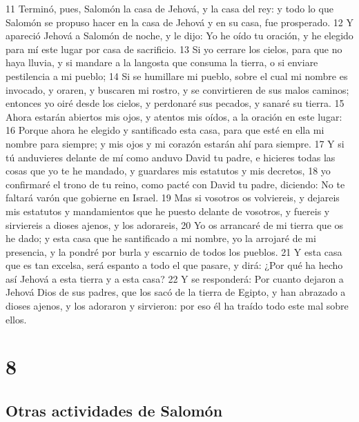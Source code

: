  
11 Terminó, pues, Salomón la casa de Jehová, y la casa del rey: y todo lo que Salomón se propuso hacer en la casa de Jehová y en su casa, fue prosperado.
12 Y apareció Jehová a Salomón de noche, y le dijo: Yo he oído tu oración, y he elegido para mí este lugar por casa de sacrificio.
13 Si yo cerrare los cielos, para que no haya lluvia, y si mandare a la langosta que consuma la tierra, o si enviare pestilencia a mi pueblo;
14 Si se humillare mi pueblo, sobre el cual mi nombre es invocado, y oraren, y buscaren mi rostro, y se convirtieren de sus malos caminos; entonces yo oiré desde los cielos, y perdonaré sus pecados, y sanaré su tierra.
15 Ahora estarán abiertos mis ojos, y atentos mis oídos, a la oración en este lugar:
16 Porque ahora he elegido y santificado esta casa, para que esté en ella mi nombre para siempre; y mis ojos y mi corazón estarán ahí para siempre.
17 Y si tú anduvieres delante de mí como anduvo David tu padre, e hicieres todas las cosas que yo te he mandado, y guardares mis estatutos y mis decretos,
18 yo confirmaré el trono de tu reino, como pacté con David tu padre, diciendo: No te faltará varón que gobierne en Israel. 
19 Mas si vosotros os volviereis, y dejareis mis estatutos y mandamientos que he puesto delante de vosotros, y fuereis y sirviereis a dioses ajenos, y los adorareis,
20 Yo os arrancaré de mi tierra que os he dado; y esta casa que he santificado a mi nombre, yo la arrojaré de mi presencia, y la pondré por burla y escarnio de todos los pueblos.
21 Y esta casa que es tan excelsa, será espanto a todo el que pasare, y dirá: ¿Por qué ha hecho así Jehová a esta tierra y a esta casa?
22 Y se responderá: Por cuanto dejaron a Jehová Dios de sus padres, que los sacó de la tierra de Egipto, y han abrazado a dioses ajenos, y los adoraron y sirvieron: por eso él ha traído todo este mal sobre ellos.

\chapter{8}

\section*{Otras actividades de Salomón}

 

